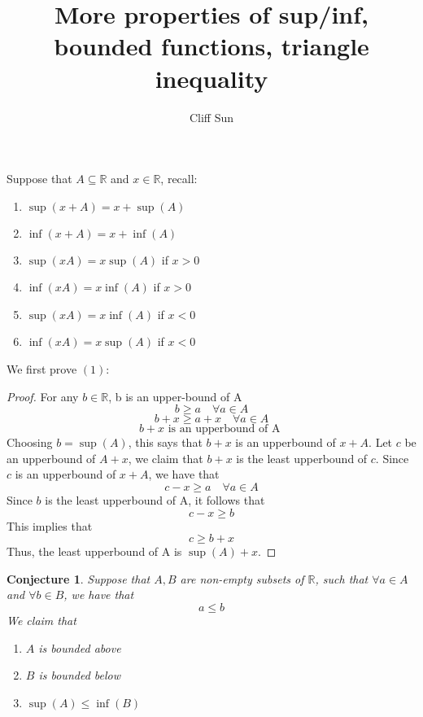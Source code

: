 \documentclass{article}
\title{More properties of sup/inf, bounded functions, triangle inequality}
\author{Cliff Sun}
\newtheorem{conjecture}[theorem]{Conjecture}
\begin{document}
\maketitle

Suppose that $A \subseteq \mathbb{R}$ and $x \in \mathbb{R}$, recall:
\begin{enumerate}
    \item $\sup(x + A) = x + \sup(A)$
    \item $\inf(x + A) = x + \inf(A)$
    \item $\sup(xA) = x\sup(A)$ if $x > 0$
    \item $\inf(xA) = x\inf(A)$ if $x > 0$
    \item $\sup(xA) = x\inf(A)$ if $x < 0$
    \item $\inf(xA) = x\sup(A)$ if $x < 0$
\end{enumerate}

We first prove $(1)$:

\begin{proof}
    For any $b \in \mathbb{R}$, b is an upper-bound of A
    \begin{equation}
        b \geq a \quad \forall a \in A
    \end{equation}
    \begin{equation}
        b + x \geq  a + x \quad \forall a \in A
    \end{equation}
    \begin{equation}
        b + x \textrm{ is an upperbound of A }
    \end{equation}
    Choosing $b = \sup(A)$, this says that $b + x$ is an upperbound of $x + A$. Let $c$ be an upperbound of $A + x$, we claim that
    $b + x$ is the least upperbound of $c$. Since $c$ is an upperbound of $x + A$, we have that 
    \begin{equation}
        c - x \geq a \quad \forall a \in A
    \end{equation}
    Since $b$ is the least upperbound of A, it follows that
    \begin{equation}
        c - x \geq b
    \end{equation}
    This implies that
    \begin{equation}
        c \geq b + x
    \end{equation}
    Thus, the least upperbound of A is $\sup(A) + x$. 
\end{proof}

\begin{conjecture}
    Suppose that $A, B$ are non-empty subsets of $\mathbb{R}$, such that $\forall a \in A$ and $\forall b \in B$, we have that 
    \begin{equation}
        a \leq b
    \end{equation}
    We claim that 
    \begin{enumerate}
        \item $A$ is bounded above
        \item $B$ is bounded below
        \item $\sup(A) \leq \inf(B)$
    \end{enumerate}
\end{conjecture}
\end{document}
